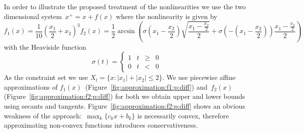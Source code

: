 \documentclass{elsarticle}
\providecommand{\abs}[1]{\left|#1\right|}
\theoremstyle{remark}
\theoremstyle{definition}
\begin{document}
In order to illustrate the proposed treatment of the nonlinearities we use the two dimensional system~$x^+=x+f(x)$ where the nonlinearity is given by
%
\begin{subequations}
\begin{equation}
  f_1(x) = \frac{1}{10}\left(\frac{x_1}{2}+x_2\right)^3
\end{equation}
\begin{equation}
  f_2(x) = \frac{1}{2}\arcsin\left(\sigma\left(x_1-\frac{x_2}{2}\right)\sqrt{\frac{x_1-\frac{x_2}{2}}{2}} + \sigma\left(-\left(x_1-\frac{x_2}{2}\right)\right)\frac{x_1-\frac{x_2}{2}}{2} \right)
\end{equation}
\end{subequations}
%
with the Heaviside function
%
$$
  \sigma(t) = \left\{\begin{array}{crcl}1& t&\geq&0\\ 0 &t&<&0 \end{array}\right.
$$
%
As the constraint set we use $X_l = \{x:\abs{x_1}+\abs{x_2}\leq 2\}$.
%
We use piecewise affine approximations of $f_1(x)$~(Figure~\ref{fig:approximation:f1:p:diff}) and~$f_2(x)$ (Figure~\ref{fig:approximation:f2:p:diff})
for both we obtain upper and lower bounds using secants and tangents.
%
Figure~\ref{fig:approximation:f2:p:diff} shows an obvious weakness of the approach:~$\max_k\{c_k x+b_k\}$ is necessarily convex, therefore approximating non-convex functions introduces conservativeness.
\end{document}
